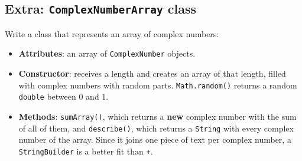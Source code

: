 \subsection{Extra: \texttt{ComplexNumberArray} class}

Write a class that represents an array of complex numbers:

\begin{itemize}

    \item \textbf{Attributes}: an array of \texttt{ComplexNumber} objects.

    \item \textbf{Constructor}: receives a length and creates an array of that length, filled with complex numbers with random parts. \texttt{Math.random()} returns a random \texttt{double} between \(0\) and \(1\).

    \item \textbf{Methods}: \texttt{sumArray()}, which returns a \textbf{new} complex number with the sum of all of them, and \texttt{describe()}, which returns a \texttt{String} with every complex number of the array. Since it joins one piece of text per complex number, a \texttt{StringBuilder} is a better fit than \texttt{+}.

\end{itemize}
